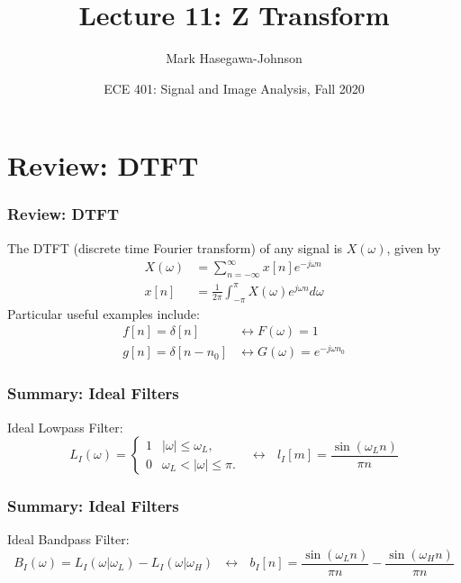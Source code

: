 \documentclass{beamer}
\title{Lecture 11: Z Transform}
\author{Mark Hasegawa-Johnson}
\date{ECE 401: Signal and Image Analysis, Fall 2020}
\begin{document}
\begin{frame}
  \maketitle
\end{frame}

\begin{frame}
  \tableofcontents
\end{frame}

\section[DTFT]{Review: DTFT}
\setcounter{subsection}{1}

\begin{frame}
  \frametitle{Review: DTFT}

  The DTFT (discrete time Fourier transform) of any signal is
  $X(\omega)$, given by
  \begin{align*}
    X(\omega) &= \sum_{n=-\infty}^\infty x[n]e^{-j\omega n}\\
    x[n] &= \frac{1}{2\pi}\int_{-\pi}^\pi X(\omega)e^{j\omega n}d\omega
  \end{align*}
  Particular useful examples include:
  \begin{align*}
    f[n]=\delta[n] &\leftrightarrow F(\omega)=1\\
    g[n]=\delta[n-n_0] &\leftrightarrow G(\omega)=e^{-j\omega n_0}
  \end{align*}
\end{frame}

\begin{frame}
  \frametitle{Summary: Ideal Filters}
  Ideal Lowpass Filter:
  \[
  L_I(\omega)
  = \begin{cases} 1& |\omega|\le\omega_L,\\
    0 & \omega_L<|\omega|\le\pi.
  \end{cases}~~~\leftrightarrow~~~
  l_I[m]=\frac{\sin(\omega_L n)}{\pi n}
  \]
\end{frame}

\begin{frame}
  \frametitle{Summary: Ideal Filters}
  Ideal Bandpass Filter:
  \[
  B_I(\omega)=L_I(\omega|\omega_L)-L_I(\omega|\omega_H)~~~\leftrightarrow~~~
  b_I[n]=\frac{\sin(\omega_L n)}{\pi n}-\frac{\sin(\omega_H n)}{\pi n}
  \]
\end{frame}
\end{document}
